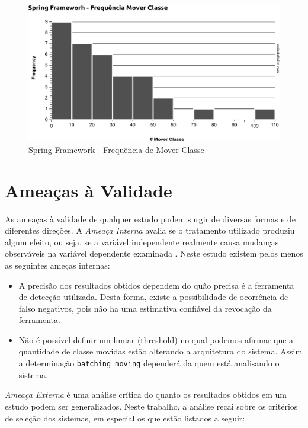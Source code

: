 \documentclass[12pt]{article}
\begin{document}
\begin{figure}[htb]
	\centering
	\includegraphics[width=0.9\linewidth]{../img/0015_Histogram_Spring_Frameworh_Frequencia_Mover_Classe}
	\caption{Spring Framework - Frequência de Mover Classe}
	\label{fig:resultado-spring}
\end{figure}

\section{Ameaças à Validade}
\label{sec:ameacas}

As ameaças à validade de qualquer estudo podem surgir de diversas formas e de diferentes direções. A \textit{Ameaça Interna} avalia se o tratamento utilizado produziu algum efeito, ou seja, se a variável independente realmente causa mudanças observáveis na variável dependente examinada \cite{7230299}. Neste estudo existem pelos menos as seguintes ameças internas:

\begin{itemize}
	\item A precisão dos resultados obtidos dependem do quão precisa é a ferramenta de detecção utilizada. Desta forma, existe a possibilidade de ocorrência de falso negativos, pois não ha uma estimativa confiável da revocação da ferramenta. 
	
	\item Não é possível definir um limiar (threshold) no qual podemos afirmar que a quantidade de classe movidas estão alterando a arquitetura do sistema. Assim a determinação \texttt{batching moving} dependerá da quem está analisando o sistema.
		
\end{itemize}
 
\textit{Ameaça Externa} é uma análise crítica do quanto os resultados obtidos em um estudo podem ser generalizados. Neste trabalho, a análise recai sobre os critérios de seleção dos sistemas, em especial os que estão listados a seguir:
 
\end{document}

